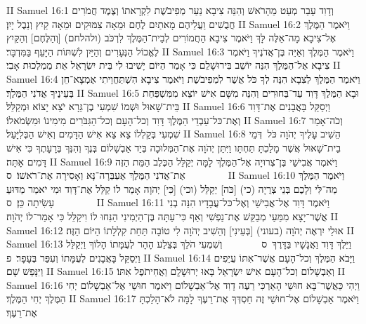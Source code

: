 II Samuel 16:1	וְדָוִד עָבַר מְעַט מֵהָרֹאשׁ וְהִנֵּה צִיבָא נַעַר מְפִיבֹשֶׁת לִקְרָאתוֹ וְצֶמֶד חֲמֹרִים חֲבֻשִׁים וַעֲלֵיהֶם מָאתַיִם לֶחֶם וּמֵאָה צִמּוּקִים וּמֵאָה קַיִץ וְנֵבֶל יָיִן׃
II Samuel 16:2	וַיֹּאמֶר הַמֶּלֶךְ אֶל־צִיבָא מָה־אֵלֶּה לָּךְ וַיֹּאמֶר צִיבָא הַחֲמוֹרִים לְבֵית־הַמֶּלֶךְ לִרְכֹּב (ולהלחם) [וְהַלֶּחֶם] וְהַקַּיִץ לֶאֱכוֹל הַנְּעָרִים וְהַיַּיִן לִשְׁתּוֹת הַיָּעֵף בַּמִּדְבָּר׃
II Samuel 16:3	וַיֹּאמֶר הַמֶּלֶךְ וְאַיֵּה בֶּן־אֲדֹנֶיךָ וַיֹּאמֶר צִיבָא אֶל־הַמֶּלֶךְ הִנֵּה יוֹשֵׁב בִּירוּשָׁלַ͏ִם כִּי אָמַר הַיּוֹם יָשִׁיבוּ לִי בֵּית יִשְׂרָאֵל אֵת מַמְלְכוּת אָבִי׃
II Samuel 16:4	וַיֹּאמֶר הַמֶּלֶךְ לְצִבָא הִנֵּה לְךָ כֹּל אֲשֶׁר לִמְפִיבֹשֶׁת וַיֹּאמֶר צִיבָא הִשְׁתַּחֲוֵיתִי אֶמְצָא־חֵן בְּעֵינֶיךָ אֲדֹנִי הַמֶּלֶךְ׃
II Samuel 16:5	וּבָא הַמֶּלֶךְ דָּוִד עַד־בַּחוּרִים וְהִנֵּה מִשָּׁם אִישׁ יוֹצֵא מִמִּשְׁפַּחַת בֵּית־שָׁאוּל וּשְׁמוֹ שִׁמְעִי בֶן־גֵּרָא יֹצֵא יָצוֹא וּמְקַלֵּל׃
II Samuel 16:6	וַיְסַקֵּל בָּאֲבָנִים אֶת־דָּוִד וְאֶת־כּל־עַבְדֵי הַמֶּלֶךְ דָּוִד וְכל־הָעָם וְכל־הַגִּבֹּרִים מִימִינוֹ וּמִשְּׂמֹאלוֹ׃
II Samuel 16:7	וְכֹה־אָמַר שִׁמְעִי בְּקַלְלוֹ צֵא צֵא אִישׁ הַדָּמִים וְאִישׁ הַבְּלִיָּעַל׃
II Samuel 16:8	הֵשִׁיב עָלֶיךָ יְהֹוָה כֹּל  דְּמֵי בֵית־שָׁאוּל אֲשֶׁר מָלַכְתָּ תַּחְתָּו וַיִּתֵּן יְהֹוָה אֶת־הַמְּלוּכָה בְּיַד אַבְשָׁלוֹם בְּנֶךָ וְהִנְּךָ בְּרָעָתֶךָ כִּי אִישׁ דָּמִים אָתָּה׃
II Samuel 16:9	וַיֹּאמֶר אֲבִישַׁי בֶּן־צְרוּיָה אֶל־הַמֶּלֶךְ לָמָּה יְקַלֵּל הַכֶּלֶב הַמֵּת הַזֶּה אֶת־אֲדֹנִי הַמֶּלֶךְ אֶעְבְּרָה־נָּא וְאָסִירָה אֶת־רֹאשׁוֹ׃ {ס}        
II Samuel 16:10	וַיֹּאמֶר הַמֶּלֶךְ מַה־לִּי וְלָכֶם בְּנֵי צְרֻיָה (כי) [כֹּה] יְקַלֵּל (וכי) [כִּי] יְהֹוָה אָמַר לוֹ קַלֵּל אֶת־דָּוִד וּמִי יֹאמַר מַדּוּעַ עָשִׂיתָה כֵּן׃ {ס}        
II Samuel 16:11	וַיֹּאמֶר דָּוִד אֶל־אֲבִישַׁי וְאֶל־כּל־עֲבָדָיו הִנֵּה בְנִי אֲשֶׁר־יָצָא מִמֵּעַי מְבַקֵּשׁ אֶת־נַפְשִׁי וְאַף כִּי־עַתָּה בֶּן־הַיְמִינִי הַנִּחוּ לוֹ וִיקַלֵּל כִּי אָמַר־לוֹ יְהֹוָה׃
II Samuel 16:12	אוּלַי יִרְאֶה יְהֹוָה (בעוני) [בְּעֵינִי] וְהֵשִׁיב יְהֹוָה לִי טוֹבָה תַּחַת קִלְלָתוֹ הַיּוֹם הַזֶּה׃
II Samuel 16:13	וַיֵּלֶךְ דָּוִד וַאֲנָשָׁיו בַּדָּרֶךְ {ס}        וְשִׁמְעִי הֹלֵךְ בְּצֵלַע הָהָר לְעֻמָּתוֹ הָלוֹךְ וַיְקַלֵּל וַיְסַקֵּל בָּאֲבָנִים לְעֻמָּתוֹ וְעִפַּר בֶּעָפָר׃ {פ}
II Samuel 16:14	וַיָּבֹא הַמֶּלֶךְ וְכל־הָעָם אֲשֶׁר־אִתּוֹ עֲיֵפִים וַיִּנָּפֵשׁ שָׁם׃
II Samuel 16:15	וְאַבְשָׁלוֹם וְכל־הָעָם אִישׁ יִשְׂרָאֵל בָּאוּ יְרוּשָׁלָ͏ִם וַאֲחִיתֹפֶל אִתּוֹ׃
II Samuel 16:16	וַיְהִי כַּאֲשֶׁר־בָּא חוּשַׁי הָאַרְכִּי רֵעֶה דָוִד אֶל־אַבְשָׁלוֹם וַיֹּאמֶר חוּשַׁי אֶל־אַבְשָׁלוֹם יְחִי הַמֶּלֶךְ יְחִי הַמֶּלֶךְ׃
II Samuel 16:17	וַיֹּאמֶר אַבְשָׁלוֹם אֶל־חוּשַׁי זֶה חַסְדְּךָ אֶת־רֵעֶךָ לָמָּה לֹא־הָלַכְתָּ אֶת־רֵעֶךָ׃

